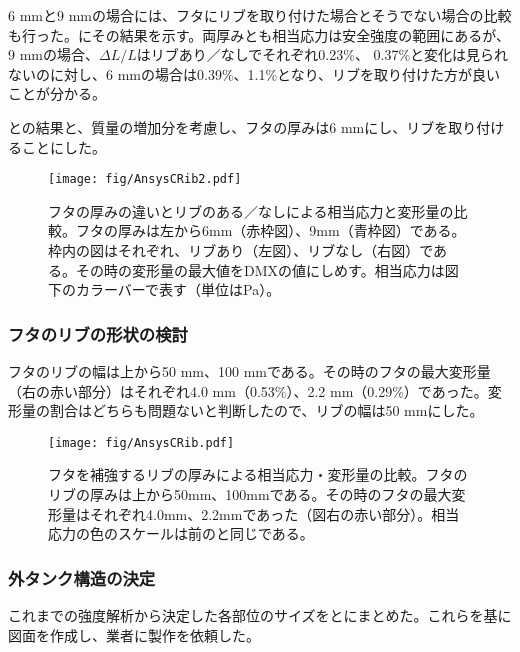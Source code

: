 6 mmと9 mmの場合には、フタにリブを取り付けた場合とそうでない場合の比較も行った。にその結果を示す。両厚みとも相当応力は安全強度の範囲にあるが、9 mmの場合、$\Delta L/L$はリブあり／なしでそれぞれ0.23\%、 0.37\%と変化は見られないのに対し、6 mmの場合は0.39\%、1.1\%となり、リブを取り付けた方が良いことが分かる。

との結果と、質量の増加分を考慮し、フタの厚みは6 mmにし、リブを取り付けることにした。

\begin{figure}[htbp]
\centering
\texttt{[image: fig/AnsysCRib2.pdf]}
\caption[フタの厚みの違いとリブのある／なしよる相当応力と変形量の比較]{フタの厚みの違いとリブのある／なしによる相当応力と変形量の比較。フタの厚みは左から6mm（赤枠図）、9mm（青枠図）である。枠内の図はそれぞれ、リブあり（左図）、リブなし（右図）である。その時の変形量の最大値をDMXの値にしめす。相当応力は図下のカラーバーで表す（単位はPa）。}
\label{AnsysCRib2}
\end{figure}


\subsubsection{フタのリブの形状の検討}
フタのリブの幅は上から50 mm、100 mmである。その時のフタの最大変形量（右の赤い部分）はそれぞれ4.0 mm（0.53\%）、2.2 mm（0.29\%）であった。変形量の割合はどちらも問題ないと判断したので、リブの幅は50 mmにした。

\begin{figure}[!h]
\centering
\texttt{[image: fig/AnsysCRib.pdf]}
\caption[フタを補強するリブの厚みによる相当応力・変形量の比較]{フタを補強するリブの厚みによる相当応力・変形量の比較。フタのリブの厚みは上から50mm、100mmである。その時のフタの最大変形量はそれぞれ4.0mm、2.2mmであった（図右の赤い部分）。相当応力の色のスケールは前のと同じである。}
\label{AnsysCRib}
\end{figure}

\newpage
\subsubsection{外タンク構造の決定}
これまでの強度解析から決定した各部位のサイズをとにまとめた。これらを基に図面を作成し、業者に製作を依頼した。

